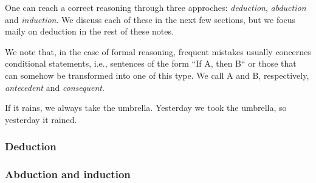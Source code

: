 \documentclass{subfiles}
\begin{document}
    One can reach a correct reasoning through three approches: 
        \emph{deduction}, \emph{abduction} and \emph{induction}. 
        We discuss each of these in the next few sections, 
        but we focus maily on deduction in the rest of these notes.

    We note that, in the case of formal reasoning, 
        frequent mistakes usually concernes conditional statements, i.e., 
        sentences of the form ``If A, then B`` or those that can somehow be transformed into one of this type.
        We call A and B, respectively, \emph{antecedent} and \emph{consequent}.

    \begin{quote*}
        If it rains, we always take the umbrella. Yesterday we took the umbrella,
        so yesterday it rained.
    \end{quote*}

    \subsubsection{Deduction}
    

    \subsubsection{Abduction and induction}
    
\end{document}
